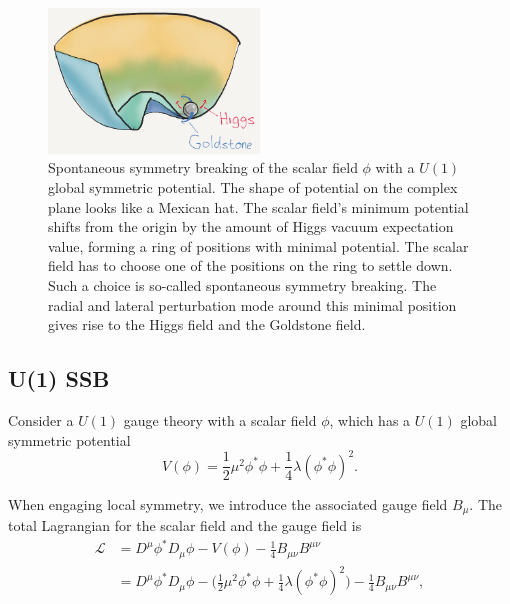 \begin{figure}[ht]
    \centering
    \includegraphics[width=0.5\textwidth]{chapters/Physics/sectionQFT/figures/Higgs.png}
    \caption{Spontaneous symmetry breaking of the scalar field $\phi$  with a $U(1)$  global symmetric potential. The shape of potential on the complex plane looks like a Mexican hat. The scalar field's minimum potential shifts from the origin by the amount of Higgs vacuum expectation value, forming a ring of positions with minimal potential. The scalar field has to choose one of the positions on the ring to settle down. Such a choice is so-called spontaneous symmetry breaking. The radial and lateral perturbation mode around this minimal position gives rise to the Higgs field and the Goldstone field. }
    \label{fig:physics:qft:higgsPotential}
\end{figure}



\subsection{U(1) SSB}

Consider a $U(1)$ gauge theory with a scalar field $\phi$, which has a $U(1)$ global symmetric potential
\begin{equation}
    V(\phi) = \frac{1}{2} \mu^2 \phi^*\phi + \frac{1}{4}\lambda(\phi^*\phi )^2.
\end{equation}


\noindent When engaging local symmetry, we introduce the associated gauge field $B_{\mu}$. The total Lagrangian for the scalar field and the gauge field is
\begin{equation}
\begin{split}
	\mathcal{L} & = D^\mu\phi^* D_\mu\phi-V(\phi)   - \frac{1}{4}B_{\mu\nu}B^{\mu\nu} \\
	& = D^\mu\phi^* D_\mu\phi- \big(\frac{1}{2} \mu^2 \phi^*\phi + \frac{1}{4} \lambda(\phi^*\phi )^2 \big)   - \frac{1}{4}B_{\mu\nu}B^{\mu\nu},
\end{split}
\label{eqn:physics:qft:u1Higgs}
\end{equation}

